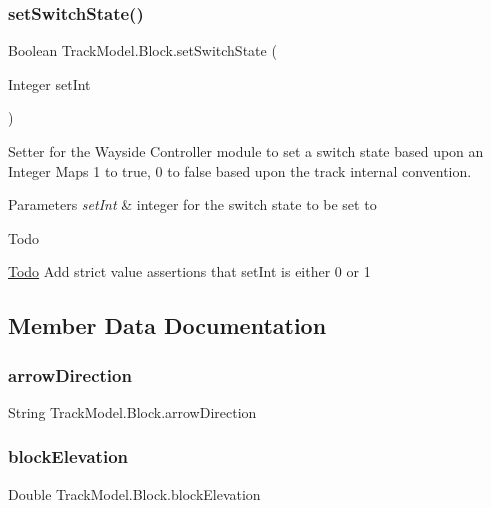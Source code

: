 \subsubsection{\texorpdfstring{set\+Switch\+State()}{setSwitchState()}}
{\footnotesize\ttfamily Boolean Track\+Model.\+Block.\+set\+Switch\+State (\begin{DoxyParamCaption}\item[{Integer}]{set\+Int }\end{DoxyParamCaption})}



Setter for the Wayside Controller module to set a switch state based upon an Integer Maps 1 to true, 0 to false based upon the track internal convention. 


\begin{DoxyParams}{Parameters}
{\em set\+Int} & integer for the switch state to be set to \\
\hline
\end{DoxyParams}
\begin{DoxyRefDesc}{Todo}
\item[\hyperlink{todo__todo000002}{Todo}]Add strict value assertions that set\+Int is either 0 or 1 \end{DoxyRefDesc}


\subsection{Member Data Documentation}
\mbox{\label{classTrackModel_1_1Block_ad5c1ad3ac7452483c42dec413dbb63ab}} 
\subsubsection{\texorpdfstring{arrow\+Direction}{arrowDirection}}
{\footnotesize\ttfamily String Track\+Model.\+Block.\+arrow\+Direction}

\mbox{\label{classTrackModel_1_1Block_ab26ac3adf1ce690a6e187df65f730b0d}} 
\subsubsection{\texorpdfstring{block\+Elevation}{blockElevation}}
{\footnotesize\ttfamily Double Track\+Model.\+Block.\+block\+Elevation}

